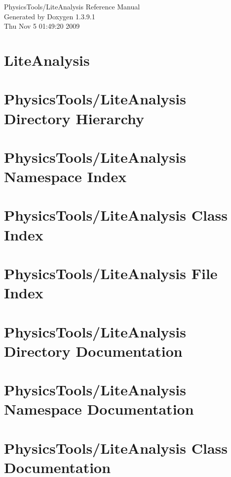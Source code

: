 \documentclass[a4paper]{book}
\begin{document}
\begin{titlepage}
\vspace*{7cm}
\begin{center}
{\Large Physics\-Tools/Lite\-Analysis Reference Manual}\\
\vspace*{1cm}
{\large Generated by Doxygen 1.3.9.1}\\
\vspace*{0.5cm}
{\small Thu Nov 5 01:49:20 2009}\\
\end{center}
\end{titlepage}
\clearemptydoublepage
{}
\tableofcontents
\clearemptydoublepage
{}
\chapter{Lite\-Analysis }
\label{index}\hypertarget{index}{}
\chapter{Physics\-Tools/Lite\-Analysis Directory Hierarchy}

\chapter{Physics\-Tools/Lite\-Analysis Namespace Index}

\chapter{Physics\-Tools/Lite\-Analysis Class Index}

\chapter{Physics\-Tools/Lite\-Analysis File Index}

\chapter{Physics\-Tools/Lite\-Analysis Directory Documentation}

\chapter{Physics\-Tools/Lite\-Analysis Namespace Documentation}

\chapter{Physics\-Tools/Lite\-Analysis Class Documentation}














\end{document}
